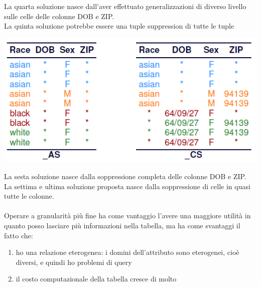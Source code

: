 La quarta soluzione nasce dall'aver effettuato generalizzazioni di diverso livello sulle celle delle colonne DOB e ZIP.\\
La quinta soluzione potrebbe essere una tuple suppression di tutte le tuple
\begin{center}
    \includegraphics[scale=0.6]{img/2anon4.png}
\end{center}
La sesta soluzione nasce dalla soppressione completa delle colonne DOB e ZIP.\\
La settima e ultima soluzione proposta nasce dalla soppressione di celle in quasi tutte le colonne.\\\\
Operare a granularità più fine ha come vantaggio l'avere una maggiore utilità in quanto posso lasciare più informazioni nella tabella, ma ha come svantaggi il fatto che:
\begin{enumerate}
    \item ho una relazione eterogenea: i domini dell'attributo sono eterogenei, cioè diversi, e quindi ho problemi di query
    \item il costo computazionale della tabella cresce di molto
\end{enumerate}

